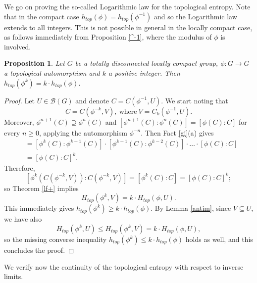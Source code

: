 \documentclass[11pt]{article}
\newtheorem{proposition}[theorem]{Proposition}
\theoremstyle{definition}
\numberwithin{equation}{section}
\begin{document}
We go on proving the so-called Logarithmic law for the topological entropy. Note that in the compact case $h_{top}(\phi)=h_{top}(\phi^{-1})$ and so the Logarithmic law extends to all integers. This is not possible in general in the locally compact case, as follows immediately from Proposition \ref{^-1}, where the modulus of $\phi$ is involved.

\begin{proposition}
Let $G$ be a totally disconnected locally compact group, $\phi:G\to G$ a topological automorphism and $k$ a positive integer. Then $h_{top}(\phi^k)=k\cdot h_{top}(\phi)$.
\end{proposition}
\begin{proof}
Let $U\in\mathcal B(G)$ and denote $C=C(\phi^{-1},U)$. We start noting that $$C=C(\phi^{-k},V),\ \text{where}\ V=C_k(\phi^{-1},U).$$
 Moreover, $\phi^{n+1}(C)\supseteq \phi^n(C)$ and $[\phi^{n+1}(C):\phi^n(C)]=[\phi(C):C]$ for every $n\geq0$, applying the automorphism $\phi^{-n}$. Then Fact \ref{gi}(a) gives 
\begin{align*}
[\phi^k(C):C]&=[\phi^k(C):\phi^{k-1}(C)]\cdot[\phi^{k-1}(C):\phi^{k-2}(C)]\cdot\ldots\cdot[\phi(C):C]\\
&=[\phi(C):C]^k.
\end{align*}
Therefore, $$[\phi^k(C(\phi^{-k},V)):C(\phi^{-k},V)]=[\phi^k(C):C]=[\phi(C):C]^k;$$
so Theorem \ref{lf+} implies $$H_{top}(\phi^k,V)=k\cdot H_{top}(\phi,U).$$
This immediately gives $h_{top}(\phi^k)\geq k\cdot h_{top}(\phi)$.
By Lemma \ref{antim}, since $V\subseteq U$, we have also $$H_{top}(\phi^k,U)\leq H_{top}(\phi^k,V)=k \cdot H_{top}(\phi,U),$$
so the missing converse inequality $h_{top}(\phi^k)\leq k\cdot h_{top}(\phi)$ holds as well, and this concludes the proof.
\end{proof}

We verify now the continuity of the topological entropy with respect to inverse limits.
\end{document}
